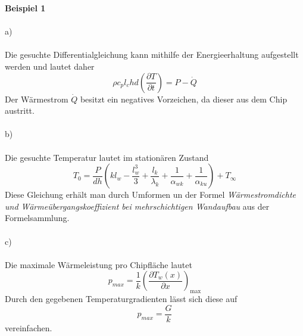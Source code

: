 \textbf{Beispiel 1}\\ \\
a)\\ \\
Die gesuchte Differentialgleichung kann mithilfe der Energieerhaltung aufgestellt werden und lautet daher
\[
	\rho c_pl_chd\left(\frac{\partial T}{\partial t}\right) = P - \dot{Q}
\]
Der Wärmestrom $\dot{Q}$ besitzt ein negatives Vorzeichen, da dieser aus dem Chip austritt.\\ \\
b)\\ \\
Die gesuchte Temperatur lautet im stationären Zustand
\[
	T_0 = \frac{P}{dh}\left(kl_w  - \frac{l_w^3}{3} + \frac{l_k}{\lambda_k} + \frac{1}{\alpha_{wk}} + \frac{1}{\alpha_{ku}}\right) + T_\infty
\]
Diese Gleichung erhält man durch Umformen un der Formel \textit{Wärmestromdichte und Wärmeübergangskoeffizient bei mehrschichtigen Wandaufbau} aus der Formelsammlung.\\ \\
c)\\ \\
Die maximale Wärmeleistung pro Chipfläche lautet
\[
	p_{max} = \frac{1}{k}\left(\frac{\partial T_w(x)}{\partial x}\right)_{\text{max}}
\]
Durch den gegebenen Temperaturgradienten lässt sich diese auf
\[
	p_{max} = \frac{G}{k}
\]
vereinfachen.